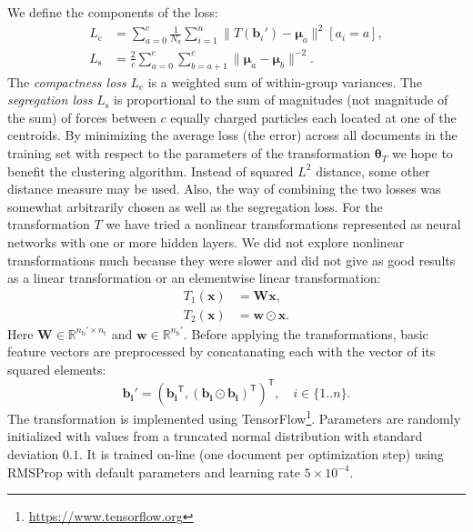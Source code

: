 \documentclass[10pt, a4paper]{article}
\newcommand{\vect}[1]{\bm{#1}}
\newcommand{\matr}[1]{\vect{#1}}
\newcommand{\transpose}{\mathsf T}
\begin{document}
We define the components of the loss: 
\begin{align}
	L_\mathrm{c} &= \sum_{a=0}^{c}\frac{1}{N_a} 
		\sum_{i=1}^{n} \| T(\vect{b}_i')-\vect{\mu}_{a}\|^2 [a_i=a], \\
	L_\mathrm{s} &= \frac{2}{c}\sum_{a=0}^{c}\sum_{b=a+1}^{c} \|\vect{\mu}_a-\vect{\mu}_b\|^{-2}.
\end{align}
The \emph{compactness loss} $L_\mathrm{c}$ is a weighted sum of within-group variances. The \emph{segregation loss}  $L_\mathrm{s}$ is proportional to the sum of magnitudes (not magnitude of the sum) of forces between $c$ equally charged particles each located at one of the centroids. By minimizing the average loss (the error) across all documents in the training set with respect to the parameters of the transformation $\vect{\theta}_T$ we hope to benefit the clustering algorithm. Instead of squared $L^2$ distance, some other distance measure may be used. Also, the way of combining the two losses was somewhat arbitrarily chosen as well as the segregation loss. For the transformation $T$ we have tried a nonlinear transformations represented as neural networks with one or more hidden layers. We did not explore nonlinear transformations much because they were slower and did not give as good results as a linear transformation or an elementwise linear transformation:
\begin{align}
	T_\mathrm{1}(\vect{x}) &= \matr{W}\vect{x}, \\
	T_\mathrm{2}(\vect{x}) &= \vect{w}\odot\vect{x}.
\end{align}
Here $\matr{W}\in \mathbb{R}^{n_\mathrm{b}'\times n_\mathrm{t}}$ and $\vect{w}\in \mathbb{R}^{n_\mathrm{b}'}$.
Before applying the transformations, basic feature vectors are preprocessed by concatanating each with the vector of its squared elements:
\begin{equation}
	\vect{b_i'} = (\vect{b_i}^\transpose, (\vect{b_i}\odot\vect{b_i})^\transpose)^\transpose, \quad i\in \{1..n\}.
\end{equation}
The transformation is implemented using TensorFlow\footnote{\url{https://www.tensorflow.org}}. Parameters are randomly initialized with values from a truncated normal distribution with standard deviation $0.1$. It is trained on-line (one document per optimization step) using RMSProp \citep{tielman-2012} with default parameters and learning rate $5\times 10^{-4}$. 
\end{document}
